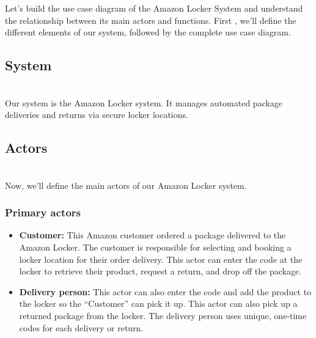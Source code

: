

Let's build the use case diagram of the Amazon Locker System and understand the relationship between its main actors and functions. First , we'll define the different elements of our system, followed by the complete use case diagram.

\subsection{System}\label{8w1-aQk_z4wkRYZ9OQ3k-}
\\
Our system is the Amazon Locker system. It manages automated package deliveries and returns via secure locker locations.

\subsection{Actors}\label{qGKhgJJDLAV05SZrzh_mL}
\\
Now, we'll define the main actors of our Amazon Locker system.

\subsubsection{Primary actors}\label{_jJtzQF2Dz_Fy8jHIqCrv}

\begin{itemize}
\item
\protect{}\label{yACOIiavU5o9TkSBY-Sd-}
\textbf{Customer:} This Amazon customer ordered a package delivered to the Amazon Locker. The customer is responsible for selecting and booking a locker location for their order delivery. This actor can enter the code at the locker to retrieve their product, request a return, and drop off the package.
\item
\protect{}\label{6LA16ZRA-pXpAElfXl7cK}
\textbf{Delivery person:} This actor can also enter the code and add the product to the locker so the ``Customer'' can pick it up. This actor can also pick up a returned package from the locker. The delivery person uses unique, one-time codes for each delivery or return.
\end{itemize}

